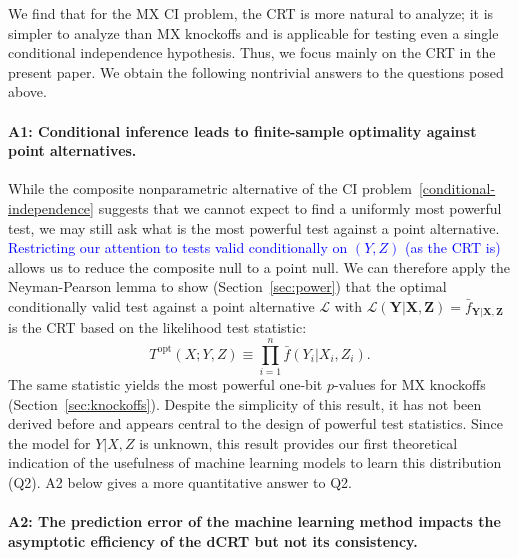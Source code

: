 \documentclass[ejs]{imsart}
\numberwithin{equation}{section}
\theoremstyle{plain}
\theoremstyle{definition}
\theoremstyle{remark}
\newcommand{\prx}{\bm X}
\newcommand{\srx}{X}
\newcommand{\prz}{\bm Z}
\newcommand{\srz}{Z}
\newcommand{\pry}{{\bm Y}}
\newcommand{\sry}{Y}
\begin{document}
We find that for the MX CI problem, the CRT is more natural to analyze; it is simpler to analyze than MX knockoffs and is applicable for testing even a single conditional independence hypothesis. Thus, we focus mainly on the CRT in the present paper. We obtain the following nontrivial answers to the questions posed above.

\paragraph{A1: Conditional inference leads to finite-sample optimality against point alternatives.}

While the composite nonparametric alternative of the CI problem~\eqref{conditional-independence} suggests that we cannot expect to find a uniformly most powerful test, we may still ask what is the most powerful test against a point alternative. \textcolor{blue}{Restricting our attention to tests valid conditionally on $(\sry, \srz)$ (as the CRT is)} allows us to reduce the composite null to a point null. We can therefore apply the Neyman-Pearson lemma to show (Section~\ref{sec:power}) that the optimal conditionally valid test against a point alternative $\mathcal L$ with $\mathcal L(\pry|\prx,\prz) = \bar f_{\pry|\prx,\prz}$ is the CRT based on the likelihood test statistic:
\begin{equation}
	T^{\text{opt}}(\srx; \sry, \srz) \equiv \prod_{i = 1}^n \bar f(\sry_i|\srx_i, \srz_i).
\end{equation}
The same statistic yields the most powerful one-bit $p$-values for MX knockoffs (Section~\ref{sec:knockoffs}). Despite the simplicity of this result, it has not been derived before and appears central to the design of powerful test statistics. Since the model for $Y|X,Z$ is unknown, this result provides our first theoretical indication of the usefulness of machine learning models to learn this distribution (Q2). A2 below gives a more quantitative answer to Q2.

\paragraph{A2: The prediction error of the machine learning method impacts the asymptotic efficiency of the dCRT but not its consistency.}
\end{document}
